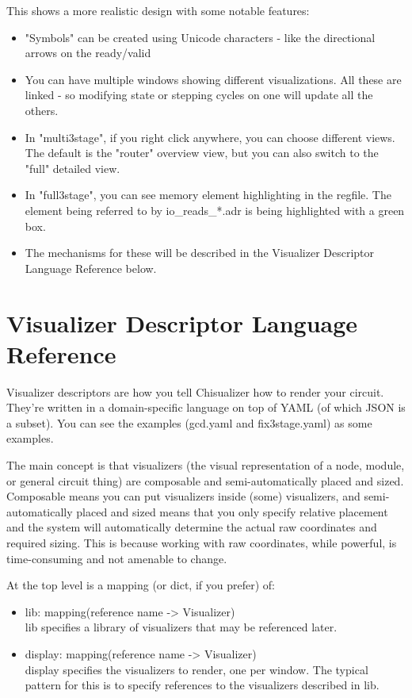 \documentclass[11pt]{article}
\begin{document}
This shows a more realistic design with some notable features:
\begin{itemize}
  \item "Symbols" can be created using Unicode characters - like the directional arrows on the ready/valid
  \item You can have multiple windows showing different visualizations. All these are linked - so modifying state or stepping cycles on one will update all the others.
  \item In "multi3stage", if you right click anywhere, you can choose different views. The default is the "router" overview view, but you can also switch to the "full" detailed view.
  \item In "full3stage", you can see memory element highlighting in the regfile. The element being referred to by io\_reads\_*.adr is being highlighted with a green box.
  \item The mechanisms for these will be described in the Visualizer Descriptor Language Reference below.
\end{itemize}

\section{Visualizer Descriptor Language Reference}
Visualizer descriptors are how you tell Chisualizer how to render your circuit. They're written in a domain-specific language on top of YAML (of which JSON is a subset). You can see the examples (gcd.yaml and fix3stage.yaml) as some examples.

The main concept is that visualizers (the visual representation of a node, module, or general circuit thing) are composable and semi-automatically placed and sized. Composable means you can put visualizers inside (some) visualizers, and semi-automatically placed and sized means that you only specify relative placement and the system will automatically determine the actual raw coordinates and required sizing. This is because working with raw coordinates, while powerful, is time-consuming and not amenable to change.

At the top level is a mapping (or dict, if you prefer) of:
\begin{itemize}
  \item lib: mapping(reference name -> Visualizer) \\
  lib specifies a library of visualizers that may be referenced later.

  \item display: mapping(reference name -> Visualizer) \\
  display specifies the visualizers to render, one per window. The typical pattern for this is to specify references to the visualizers described in lib.
\end{itemize}
\end{document}
